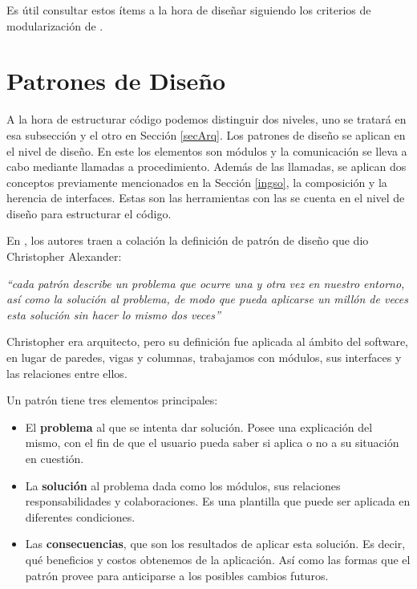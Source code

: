 Es útil consultar estos ítems a la hora de diseñar siguiendo los criterios de modularización de \cite{Parnas1972}.




\section{Patrones de Diseño}

A la hora de estructurar código podemos distinguir dos niveles, uno se tratará en esa subsección y el otro en Sección \ref{secArq}. Los patrones de diseño se aplican en el nivel de diseño. En este los elementos son módulos y la comunicación se lleva a cabo mediante llamadas a procedimiento. Además de las llamadas, se aplican dos conceptos previamente mencionados en la Sección \ref{ingso}, la composición y la herencia de interfaces. Estas son las herramientas con las se cuenta en el nivel de diseño para estructurar el código.

En \cite{Gamma:1995:DPE:186897}, los autores traen a colación la definición de patrón de diseño que dio Christopher Alexander:

\textit{``cada patrón describe un problema que ocurre una y otra vez en nuestro entorno, así como la solución al problema, de modo que pueda aplicarse un millón de veces esta solución sin hacer lo mismo dos veces''}

Christopher era arquitecto, pero su definición fue aplicada al ámbito del software, en lugar de paredes, vigas y columnas, trabajamos con módulos, sus interfaces y las relaciones entre ellos.

Un patrón tiene tres elementos principales:

\begin{itemize}
	\item El \textbf{problema} al que se intenta dar solución. Posee una explicación del mismo, con el fin de que el usuario pueda saber si aplica o no a su situación en cuestión.
	\item La \textbf{solución} al problema dada como los módulos, sus relaciones responsabilidades y colaboraciones. Es una plantilla que puede ser aplicada en diferentes condiciones.
	\item Las \textbf{consecuencias}, que son los resultados de aplicar esta solución. Es decir, qué beneficios y costos obtenemos de la aplicación. Así como las formas que el patrón provee para anticiparse a los posibles cambios futuros.
\end{itemize}

